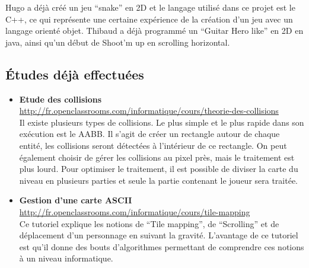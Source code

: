 \documentclass[11pt]{report}
\begin{document}
	Hugo a déjà créé un jeu “snake” en 2D et le langage utilisé dans ce projet est le C++, ce qui représente une certaine expérience de la création d’un jeu avec un langage orienté objet. 
	Thibaud a déjà programmé un “Guitar Hero like” en 2D en java, ainsi qu’un début de Shoot’m up en scrolling horizontal.

			\subsection{Études déjà effectuées}

				\begin{itemize}
				  \item \textbf{Etude des collisions}\\
				  	\url{http://fr.openclassrooms.com/informatique/cours/theorie-des-collisions}\\
				  	Il existe plusieurs types de collisions. Le plus simple et le plus rapide dans son exécution est le AABB. Il s’agit de créer un rectangle autour de chaque entité, les collisions seront détectées à l’intérieur de ce rectangle. On peut également choisir de gérer les collisions au pixel près, mais le traitement est plus lourd. Pour optimiser le traitement, il est possible de diviser la carte du niveau en plusieurs parties et seule la partie contenant le joueur sera traitée.
				  	
				  \item \textbf{Gestion d’une carte ASCII}\\
				  	\url{http://fr.openclassrooms.com/informatique/cours/tile-mapping}\\
		      		Ce tutoriel explique les notions de “Tile mapping”, de “Scrolling” et de déplacement d’un personnage en suivant la gravité. L’avantage de ce tutoriel est qu’il donne des bouts d’algorithmes permettant de comprendre ces notions à un niveau informatique.
		      		

\end{itemize}
\end{document}
